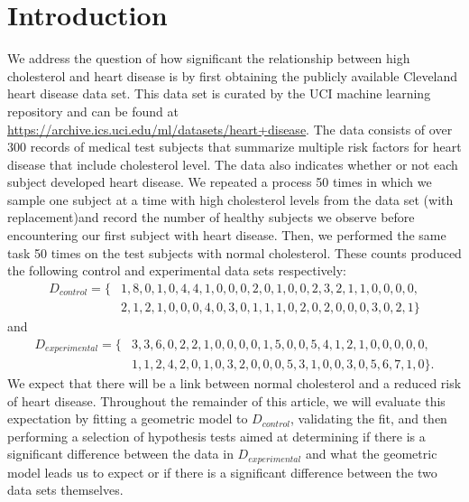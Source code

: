 \documentclass{amsart}
\begin{document}
\section{Introduction}\label{S:Introduction}
We address the question of how significant the relationship between high cholesterol and heart disease is by first obtaining the publicly available Cleveland heart disease data set. This data set is curated by the UCI machine learning repository and can be found at \url{https://archive.ics.uci.edu/ml/datasets/heart+disease}. The data consists of over 300 records of medical test subjects that summarize multiple risk factors for heart disease that include cholesterol level. The data also indicates whether or not each subject developed heart disease. We repeated a process 50 times in which we sample one subject at a time with high cholesterol levels from the data set (with replacement)and record the number of healthy subjects we observe before encountering our first subject with heart disease. Then, we performed the same task 50 times on the test subjects with normal cholesterol. These counts produced the following control and experimental data sets respectively:
\begin{align*}
D_{control}=\{&1, 8, 0, 1, 0, 4, 4, 1, 0, 0, 0, 2, 0, 1, 0, 0, 2, 3, 2, 1, 1, 0, 0, 0, 0,\\
&2, 1, 2, 1, 0, 0, 0, 4, 0, 3, 0, 1, 1, 1, 0, 2, 0, 2, 0, 0, 0, 3, 0, 2, 1
\}
\end{align*}
and
\begin{align*}
D_{experimental}=\{&3, 3, 6, 0, 2, 2, 1, 0, 0, 0, 0, 1, 5, 0, 0, 5, 4, 1, 2, 1, 0, 0, 0, 0, 0,\\
&1, 1, 2, 4, 2, 0, 1, 0, 3, 2, 0, 0, 0, 5, 3, 1, 0, 0, 3, 0, 5, 6, 7, 1, 0
\}.
\end{align*}
We expect that there will be a link between normal cholesterol and a reduced risk of heart disease. Throughout the remainder of this article, we will evaluate this expectation by fitting a geometric model to $D_{control}$, validating the fit, and then performing a selection of hypothesis tests aimed at determining if there is a significant difference between the data in $D_{experimental}$ and what the geometric model leads us to expect or if there is a significant difference between the two data sets themselves.
\end{document}
